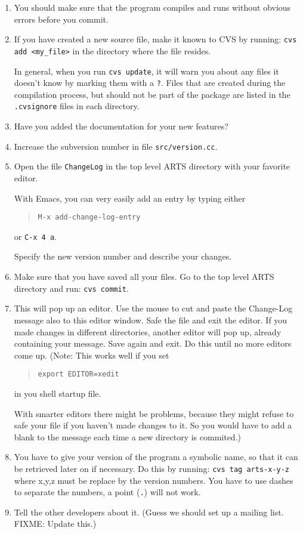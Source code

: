 \begin{enumerate}
\item You should make sure that the program compiles and runs without
  obvious errors before you commit.
\item If you have created a new source file, make it known to CVS by
  running: \verb|cvs add <my_file>| in the directory where the file
  resides.
  
  In general, when you run \verb|cvs update|, it will warn you about
  any files it doesn't know by marking them with a \verb|?|. Files
  that are created during the compilation process, but should not be
  part of the package are listed in the \verb|.cvsignore| files in
  each directory.
\item Have you added the documentation for your new features?
\item Increase the subversion number in file \verb|src/version.cc|.
\item Open the file \verb|ChangeLog| in the top level ARTS directory
  with your favorite editor.
  
  With Emacs, you can very easily add an entry by typing either
  \begin{quote}
    \verb|M-x add-change-log-entry|
  \end{quote}
  or \verb|C-x 4 a|.

  Specify the new version number and describe your changes.
\item Make sure that you have saved all your files. Go to the top
  level ARTS directory and run: \verb|cvs commit|.
\item This will pop up an editor. Use the mouse to cut and paste the
  Change-Log message also to this editor window. Safe the file and exit
  the editor. If you made changes in different directories, another
  editor will pop up, already containing your message. Save again and
  exit. Do this until no more editors come up. (Note: This works well
  if you set
  \begin{quote}
    \verb|export EDITOR=xedit|
  \end{quote}
  in you shell startup file.
 
  With smarter editors there might be problems, because they might
  refuse to safe your file if you haven't made changes to it. So you
  would have to add a blank to the message each time a new directory
  is commited.)
\item You have to give your version of the program a symbolic name, so
  that it can be retrieved later on if necessary. Do this by running:
  \verb|cvs tag arts-x-y-z| where x,y,z must be replace by the version
  numbers. You have to use dashes to separate the numbers, a point
  (\verb|.|) will not work.
\item Tell the other developers about it. (Guess we should set up a
  mailing list. FIXME: Update this.)
\end{enumerate}


